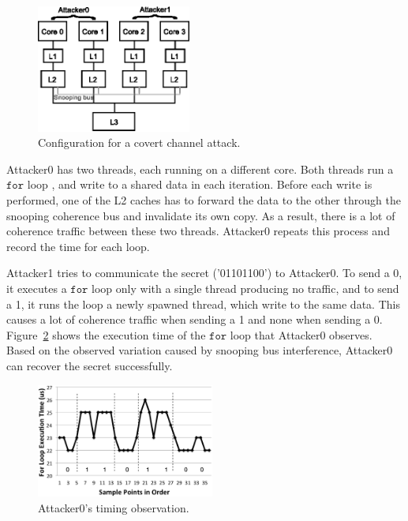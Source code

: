 \begin{figure}
    \begin{center}
        \includegraphics[width=2in]{figs/coherent_system.eps}
        \caption{Configuration for a covert channel attack.}
        \label{fig:coherent_system}
		\vspace{-0.2in}
    \end{center}
\end{figure}

Attacker0 has two threads, each running on a different core. Both threads run a 
$\mathtt{for }$ loop , and write to a shared data in each iteration.
Before each write is performed, one of the L2 caches has to forward the data
to the other through the snooping coherence bus and invalidate its own copy.
As a result, there is a lot of coherence traffic between these two threads.
Attacker0 repeats this process and record the time for each loop.

Attacker1 tries to communicate the secret ('01101100') to Attacker0.
To send a 0, it executes a $\mathtt{for }$ loop only with a single thread 
producing no traffic, and to send a 1, it runs the loop a newly spawned thread, 
which write to the same data. This causes a lot of coherence traffic when 
sending a 1 and none when sending a 0.
Figure~\ref{fig:coherence_interference} shows the execution time of the $\mathtt{for }$ 
loop that Attacker0 observes.
Based on the observed variation caused by snooping bus interference, Attacker0
can recover the secret successfully.

\begin{figure}
    \begin{center}
        \includegraphics[width=2.3in]{figs/coherence_interference.eps}
        \caption{Attacker0's timing observation.}
        \label{fig:coherence_interference}
		\vspace{-0.2in}
    \end{center}
\end{figure}


